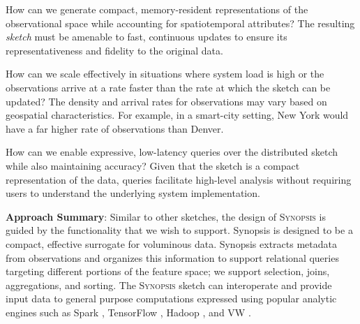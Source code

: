 \begin{description}[leftmargin=*]
    \item[\emph{RQ-1:}] How can we generate compact, memory-resident representations of the observational space while accounting for spatiotemporal attributes? The resulting \emph{sketch} must be amenable to fast, continuous updates to ensure its representativeness and fidelity to the original data.
    \item[\emph{RQ-2:}] How can we scale effectively in situations where system load is high or the observations arrive at a rate faster than the rate at which the sketch can be updated? The density and arrival rates for observations may vary based on geospatial characteristics. For example, in a smart-city setting, New York would have a far higher rate of observations than Denver.
    \item[\emph{RQ-3:}] How can we enable expressive, low-latency queries over the distributed sketch while also maintaining accuracy?  Given that the sketch is a compact representation of the data, queries facilitate high-level analysis without requiring users to understand the underlying system implementation.
\end{description}
%
\vspace{0.7em}
%
\textbf{Approach Summary}:
Similar to other sketches, the design of \textsc{Synopsis} is guided by the functionality that we wish to support. Synopsis is designed to be a compact, effective surrogate for voluminous data.   Synopsis extracts metadata from observations and organizes this information to support relational queries targeting different portions of the feature space; we support selection, joins, aggregations, and sorting. The \textsc{Synopsis} sketch can interoperate and provide input data to general purpose computations expressed using popular analytic engines such as Spark \cite{zaharia2010spark,armbrust2015spark}, TensorFlow \cite{abadi2016tensorflow,tensorflow}, Hadoop \cite{hadoop,shvachko2010hadoop,borthakur2008hdfs}, and VW \cite{langford2007vowpal}.

